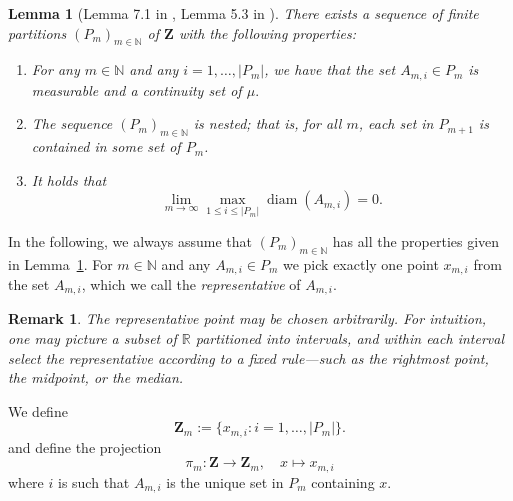\documentclass[12pt,twoside,a4paper]{article}
\newtheorem{lemma}[theorem]{Lemma}
\newtheorem{remark}[theorem]{Remark}
\def\R{\mathbb{R}}
\newcommand{\Space}{\mathbf{Z}}
\begin{document}
\begin{lemma}[Lemma 7.1 in \cite{bollobas2007phase}, Lemma 5.3 in \cite{andreis2023large}]\label{Lemm:AndreisApprox}
There exists a sequence of finite partitions $ (P_m)_{m \in \mathbb{N}}$ of $\Space$ with the following properties:
\begin{enumerate}
    \item For any $m \in \mathbb{N}$ and any $ i = 1, \ldots, |P_m| $, we have that the set $ A_{m,i} \in P_m $ is measurable and a continuity set of $ \mu.$ 
    
    \item The sequence $ (P_m)_{m \in \mathbb{N}} $ is nested; that is, for all \( m \), each set in $ P_{m+1} $ is contained in some set of $ P_m $.
    
    \item It holds that
    \begin{equation}
        \lim_{m \to \infty} \max_{1 \leq i \leq |P_m|} \operatorname{diam}(A_{m,i}) = 0.
    \end{equation}
\end{enumerate}
\end{lemma}

In the following, we always assume that $(P_m)_{m \in \mathbb{N}}$ has all the properties given in Lemma~\ref{Lemm:AndreisApprox}. For $m \in \mathbb{N}$ and any $A_{m,i} \in P_m$ we pick exactly one point $x_{m,i}$ from the set $A_{m,i}$, which we call the \emph{representative} of $A_{m,i}$. 
\begin{remark}
    The representative point may be chosen arbitrarily. For intuition, one may picture a subset of $\R$ partitioned into intervals, and within each interval select the representative according to a fixed rule—such as the rightmost point, the midpoint, or the median. 
\end{remark}
We define
\begin{equation}\label{eq:DiscTypeSpace}
\Space_m := \{x_{m,i} : i = 1, \ldots, |P_m|\}.
\end{equation}
and define the projection
\begin{equation}
\pi_m : \Space \to \Space_m, \quad x \mapsto x_{m,i}
\end{equation}
where $i$ is such that $A_{m,i}$ is the unique set in $P_m$ containing $x$.
\end{document}
